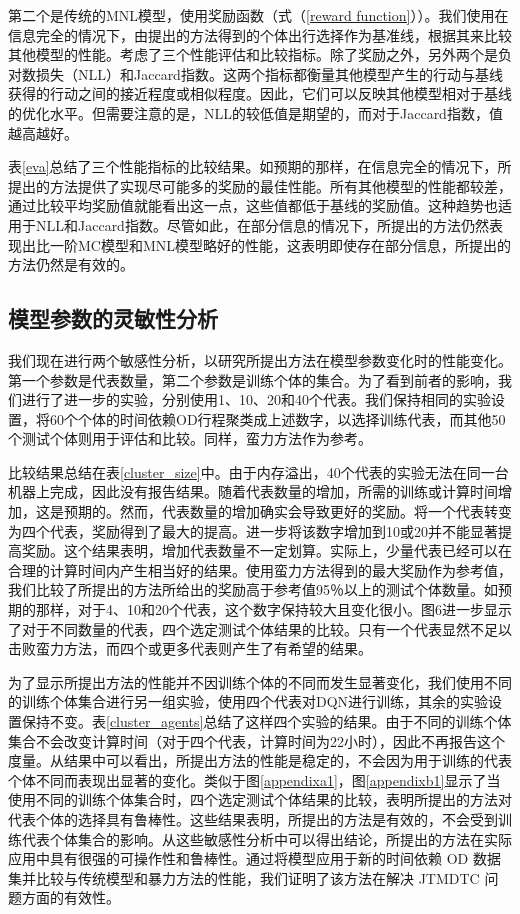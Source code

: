 第二个是传统的MNL模型，使用奖励函数（式（\ref{reward function}））。我们使用在信息完全的情况下，由提出的方法得到的个体出行选择作为基准线，根据其来比较其他模型的性能。考虑了三个性能评估和比较指标。除了奖励之外，另外两个是负对数损失（NLL）和Jaccard指数。这两个指标都衡量其他模型产生的行动与基线获得的行动之间的接近程度或相似程度。因此，它们可以反映其他模型相对于基线的优化水平。但需要注意的是，NLL的较低值是期望的，而对于Jaccard指数，值越高越好。

表\ref{eva}总结了三个性能指标的比较结果。如预期的那样，在信息完全的情况下，所提出的方法提供了实现尽可能多的奖励的最佳性能。所有其他模型的性能都较差，通过比较平均奖励值就能看出这一点，这些值都低于基线的奖励值。这种趋势也适用于NLL和Jaccard指数。尽管如此，在部分信息的情况下，所提出的方法仍然表现出比一阶MC模型和MNL模型略好的性能，这表明即使存在部分信息，所提出的方法仍然是有效的。

\subsection{模型参数的灵敏性分析}

我们现在进行两个敏感性分析，以研究所提出方法在模型参数变化时的性能变化。第一个参数是代表数量，第二个参数是训练个体的集合。为了看到前者的影响，我们进行了进一步的实验，分别使用1、10、20和40个代表。我们保持相同的实验设置，将60个个体的时间依赖OD行程聚类成上述数字，以选择训练代表，而其他50个测试个体则用于评估和比较。同样，蛮力方法作为参考。

比较结果总结在表\ref{cluster_size}中。由于内存溢出，40个代表的实验无法在同一台机器上完成，因此没有报告结果。随着代表数量的增加，所需的训练或计算时间增加，这是预期的。然而，代表数量的增加确实会导致更好的奖励。将一个代表转变为四个代表，奖励得到了最大的提高。进一步将该数字增加到10或20并不能显著提高奖励。这个结果表明，增加代表数量不一定划算。实际上，少量代表已经可以在合理的计算时间内产生相当好的结果。使用蛮力方法得到的最大奖励作为参考值，我们比较了所提出的方法所给出的奖励高于参考值95％以上的测试个体数量。如预期的那样，对于4、10和20个代表，这个数字保持较大且变化很小。图6进一步显示了对于不同数量的代表，四个选定测试个体结果的比较。只有一个代表显然不足以击败蛮力方法，而四个或更多代表则产生了有希望的结果。

为了显示所提出方法的性能并不因训练个体的不同而发生显著变化，我们使用不同的训练个体集合进行另一组实验，使用四个代表对DQN进行训练，其余的实验设置保持不变。表\ref{cluster_agents}总结了这样四个实验的结果。由于不同的训练个体集合不会改变计算时间（对于四个代表，计算时间为22小时），因此不再报告这个度量。从结果中可以看出，所提出方法的性能是稳定的，不会因为用于训练的代表个体不同而表现出显著的变化。类似于图\ref{appendixa1}，图\ref{appendixb1}显示了当使用不同的训练个体集合时，四个选定测试个体结果的比较，表明所提出的方法对代表个体的选择具有鲁棒性。这些结果表明，所提出的方法是有效的，不会受到训练代表个体集合的影响。从这些敏感性分析中可以得出结论，所提出的方法在实际应用中具有很强的可操作性和鲁棒性。通过将模型应用于新的时间依赖 OD 数据集并比较与传统模型和暴力方法的性能，我们证明了该方法在解决 JTMDTC 问题方面的有效性。
